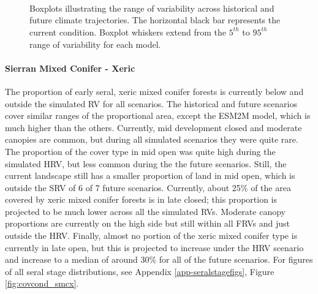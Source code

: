 \documentclass[12pt]{article}
\begin{document}
\begin{spacing}{1}
\begin{figure}[htbp]
  \centering
  \qquad
   \\
  \qquad
   \\
       \\
  \qquad
    \qquad
    \caption{Boxplots illustrating the range of variability across historical and future climate trajectories. The horizontal black bar represents the current condition. Boxplot whiskers extend from the $5^{th}$ to $95^{th}$ range of variability for each model. }
  \label{fig:covcond_smcm}
\end{figure} %

\paragraph{Sierran Mixed Conifer - Xeric} The proportion of early seral, xeric mixed conifer forests is currently below and outside the simulated RV for all scenarios. The historical and future scenarios cover similar ranges of the proportional area, except the ESM2M model, which is much higher than the others. Currently, mid development closed and moderate canopies are common, but during all simulated scenarios they were quite rare. The proportion of the cover type in mid open was quite high during the simulated HRV, but less common during the the future scenarios. Still, the current landscape still has a smaller proportion of land in mid open, which is outside the SRV of 6 of 7 future scenarios. Currently, about 25\% of the area covered by xeric mixed conifer forests is in late closed; this proportion is projected to be much lower across all the simulated RVs. Moderate canopy proportions are currently on the high side but still within all FRVs and just outside the HRV. Finally, almost no portion of the xeric mixed conifer type is currently in late open, but this is projected to increase under the HRV scenario and increase to a median of around 30\% for all of the future scenarios. For figures of all seral stage distributions, see Appendix \ref{app-seralstagefigs}, Figure \ref{fig:covcond_smcx}.


\end{spacing}
\end{document}
